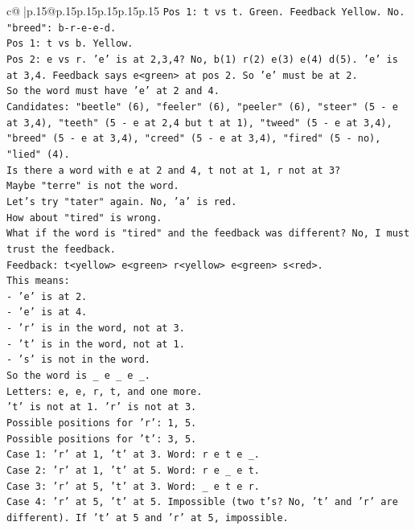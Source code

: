 \documentclass{article}
\begin{document}
{\begin{supertabular}{c@{$\;$}|p{.15\linewidth}@{}p{.15\linewidth}p{.15\linewidth}p{.15\linewidth}p{.15\linewidth}p{.15\linewidth}}
{{{\texttt{Pos 1: t vs t. Green. Feedback Yellow. No.} \\
\texttt{"breed": b{-}r{-}e{-}e{-}d.} \\
\texttt{Pos 1: t vs b. Yellow.} \\
\texttt{Pos 2: e vs r. 'e' is at 2,3,4? No, b(1) r(2) e(3) e(4) d(5). 'e' is at 3,4. Feedback says e<green> at pos 2. So 'e' must be at 2.} \\
\texttt{So the word must have 'e' at 2 and 4.} \\
\texttt{Candidates: "beetle" (6), "feeler" (6), "peeler" (6), "steer" (5 {-} e at 3,4), "teeth" (5 {-} e at 2,4 but t at 1), "tweed" (5 {-} e at 3,4), "breed" (5 {-} e at 3,4), "creed" (5 {-} e at 3,4), "fired" (5 {-} no), "lied" (4).} \\
\texttt{Is there a word with e at 2 and 4, t not at 1, r not at 3?} \\
\texttt{Maybe "terre" is not the word.} \\
\texttt{Let's try "tater" again. No, 'a' is red.} \\
\texttt{How about "tired" is wrong.} \\
\texttt{What if the word is "tired" and the feedback was different? No, I must trust the feedback.} \\
\texttt{Feedback: t<yellow> e<green> r<yellow> e<green> s<red>.} \\
\texttt{This means:} \\
\texttt{{-} 'e' is at 2.} \\
\texttt{{-} 'e' is at 4.} \\
\texttt{{-} 'r' is in the word, not at 3.} \\
\texttt{{-} 't' is in the word, not at 1.} \\
\texttt{{-} 's' is not in the word.} \\
\texttt{So the word is \_ e \_ e \_.} \\
\texttt{Letters: e, e, r, t, and one more.} \\
\texttt{'t' is not at 1. 'r' is not at 3.} \\
\texttt{Possible positions for 'r': 1, 5.} \\
\texttt{Possible positions for 't': 3, 5.} \\
\texttt{Case 1: 'r' at 1, 't' at 3. Word: r e t e \_.} \\
\texttt{Case 2: 'r' at 1, 't' at 5. Word: r e \_ e t.} \\
\texttt{Case 3: 'r' at 5, 't' at 3. Word: \_ e t e r.} \\
\texttt{Case 4: 'r' at 5, 't' at 5. Impossible (two t's? No, 't' and 'r' are different). If 't' at 5 and 'r' at 5, impossible.} \\
}}}
\end{supertabular}}
\end{document}

